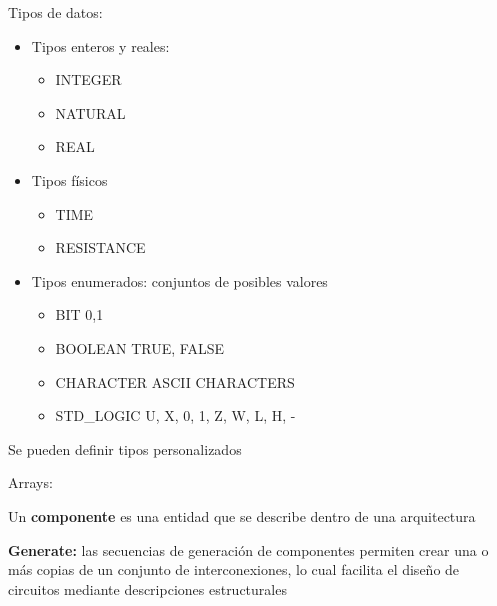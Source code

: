 Tipos de datos:
\begin{itemize}
	\item Tipos enteros y reales:
	      \begin{itemize}
		      \item INTEGER
		      \item NATURAL
		      \item REAL
	      \end{itemize}
	\item Tipos físicos
	      \begin{itemize}
		      \item TIME
		      \item RESISTANCE
	      \end{itemize}
	\item Tipos enumerados: conjuntos de posibles valores
	      \begin{itemize}
		      \item BIT {0,1}
		      \item BOOLEAN {TRUE, FALSE}
		      \item CHARACTER {ASCII CHARACTERS}
		      \item STD\_LOGIC {U, X, 0, 1, Z, W, L, H, -}
	      \end{itemize}
\end{itemize}

Se pueden definir tipos personalizados

\begin{figure}[H]
	\centering
	
\end{figure}

Arrays:

\begin{figure}[H]
	\centering
	
\end{figure}

Un \textbf{componente} es una entidad que se describe dentro de una arquitectura
\begin{figure}[H]
	\centering
	
\end{figure}


\textbf{Generate:} las secuencias de generación de componentes permiten crear una o más copias de un conjunto de interconexiones, lo cual facilita el diseño de circuitos mediante descripciones estructurales

